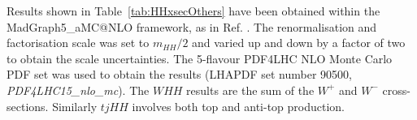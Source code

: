
\begin{table}[h!]
\renewcommand{\arraystretch}{1.6}
\begin{center}
\end{center} 
\caption{Signal cross section (in fb) for HH production at NLO QCD.}  
\label{tab:HHxsecOthers}
\end{table}
Results  shown in Table~\ref{tab:HHxsecOthers} have been obtained within the {\sc MadGraph5\_aMC@NLO} \cite{Alwall:2014hca} framework, as in Ref. \cite{Frederix:2014hta}. The renormalisation and factorisation scale was set to $m_{HH}/2$ and varied up and down by a factor of two to obtain the scale uncertainties. The 5-flavour PDF4LHC NLO Monte Carlo PDF set was used to obtain the results (LHAPDF set number 90500, \textit {PDF4LHC15\_nlo\_mc}). The $WHH$ results are the sum of the $W^+$ and $W^-$ cross-sections. Similarly $tjHH$ involves both top and anti-top production. 

